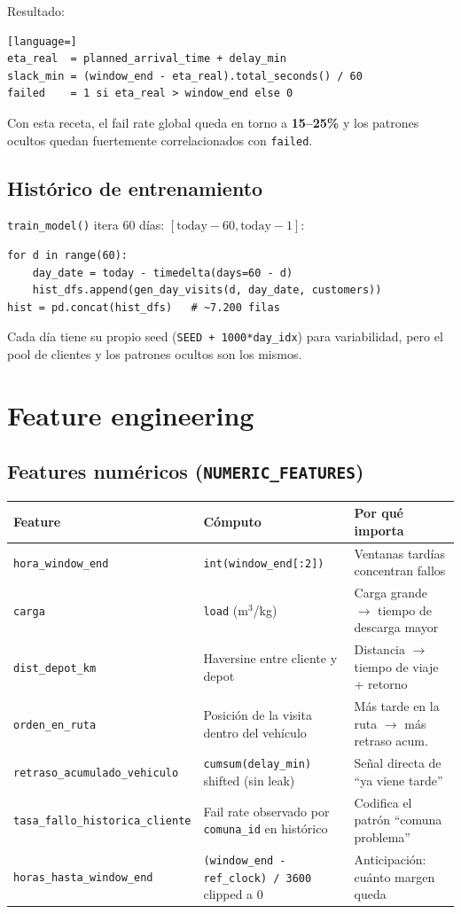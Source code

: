 \documentclass[11pt,a4paper]{article}
\begin{document}
Resultado:

\begin{lstlisting}[language=]
eta_real  = planned_arrival_time + delay_min
slack_min = (window_end - eta_real).total_seconds() / 60
failed    = 1 si eta_real > window_end else 0
\end{lstlisting}

Con esta receta, el fail rate global queda en torno a \textbf{15--25\%} y los patrones ocultos quedan fuertemente correlacionados con \texttt{failed}.

\subsection{Histórico de entrenamiento}

\texttt{train\_model()} itera 60 días: $[\text{today} - 60, \text{today} - 1]$:

\begin{lstlisting}[language=pyplus]
for d in range(60):
    day_date = today - timedelta(days=60 - d)
    hist_dfs.append(gen_day_visits(d, day_date, customers))
hist = pd.concat(hist_dfs)   # ~7.200 filas
\end{lstlisting}

Cada día tiene su propio seed (\texttt{SEED + 1000*day\_idx}) para variabilidad, pero el pool de clientes y los patrones ocultos son los mismos.

\section{Feature engineering}

\subsection{Features numéricos (\texttt{NUMERIC\_FEATURES})}

\begin{longtable}{p{4.2cm} p{6cm} p{5cm}}
\toprule
\textbf{Feature} & \textbf{Cómputo} & \textbf{Por qué importa} \\
\midrule
\endhead
\texttt{hora\_window\_end} & \texttt{int(window\_end[:2])} & Ventanas tardías concentran fallos \\
\texttt{carga} & \texttt{load} (m$^3$/kg) & Carga grande $\rightarrow$ tiempo de descarga mayor \\
\texttt{dist\_depot\_km} & Haversine entre cliente y depot & Distancia $\rightarrow$ tiempo de viaje + retorno \\
\texttt{orden\_en\_ruta} & Posición de la visita dentro del vehículo & Más tarde en la ruta $\rightarrow$ más retraso acum. \\
\texttt{retraso\_acumulado\_vehiculo} & \texttt{cumsum(delay\_min)} shifted (sin leak) & Señal directa de ``ya viene tarde'' \\
\texttt{tasa\_fallo\_historica\_cliente} & Fail rate observado por \texttt{comuna\_id} en histórico & Codifica el patrón ``comuna problema'' \\
\texttt{horas\_hasta\_window\_end} & \texttt{(window\_end - ref\_clock) / 3600} clipped a 0 & Anticipación: cuánto margen queda \\
\bottomrule
\end{longtable}
\end{document}
